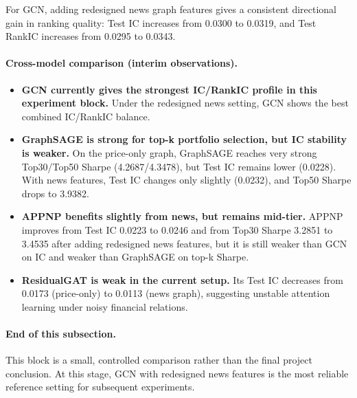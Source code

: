 For GCN, adding redesigned news graph features gives a consistent directional gain in ranking quality: Test IC increases from 0.0300 to 0.0319, and Test RankIC increases from 0.0295 to 0.0343.

\paragraph{Cross-model comparison (interim observations).}
\begin{itemize}
\item \textbf{GCN currently gives the strongest IC/RankIC profile in this experiment block.} Under the redesigned news setting, GCN shows the best combined IC/RankIC balance.
\item \textbf{GraphSAGE is strong for top-k portfolio selection, but IC stability is weaker.} On the price-only graph, GraphSAGE reaches very strong Top30/Top50 Sharpe (4.2687/4.3478), but Test IC remains lower (0.0228). With news features, Test IC changes only slightly (0.0232), and Top50 Sharpe drops to 3.9382.
\item \textbf{APPNP benefits slightly from news, but remains mid-tier.} APPNP improves from Test IC 0.0223 to 0.0246 and from Top30 Sharpe 3.2851 to 3.4535 after adding redesigned news features, but it is still weaker than GCN on IC and weaker than GraphSAGE on top-k Sharpe.
\item \textbf{ResidualGAT is weak in the current setup.} Its Test IC decreases from 0.0173 (price-only) to 0.0113 (news graph), suggesting unstable attention learning under noisy financial relations.
\end{itemize}

\paragraph{End of this subsection.}
This block is a small, controlled comparison rather than the final project conclusion. At this stage, GCN with redesigned news features is the most reliable reference setting for subsequent experiments.

